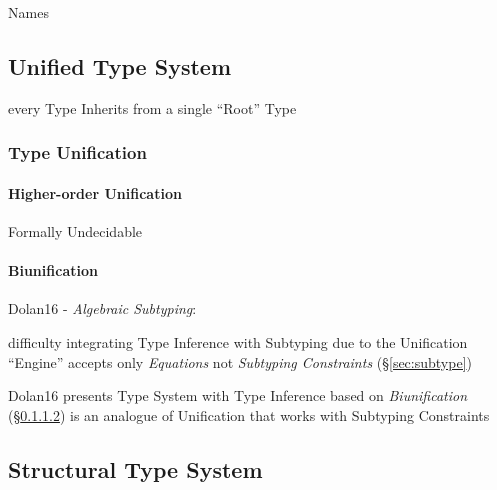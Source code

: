 Names



\subsection{Unified Type System}\label{sec:unified_type_system}

every Type Inherits from a single ``Root'' Type



\subsubsection{Type Unification}\label{sec:type_unification}




\paragraph{Higher-order Unification}
\label{sec:higherorder_unification}\hfill

Formally Undecidable



\paragraph{Biunification}\label{sec:biunification}\hfill

Dolan16 - \emph{Algebraic Subtyping}:

difficulty integrating Type Inference with Subtyping due to the
Unification ``Engine'' accepts only \emph{Equations} not
\emph{Subtyping Constraints} (\S\ref{sec:subtype})

Dolan16 presents Type System with Type Inference based on
\emph{Biunification} (\S\ref{sec:biunification}) is an analogue of
Unification that works with Subtyping Constraints



\subsection{Structural Type System}\label{sec:structural_type_system}

